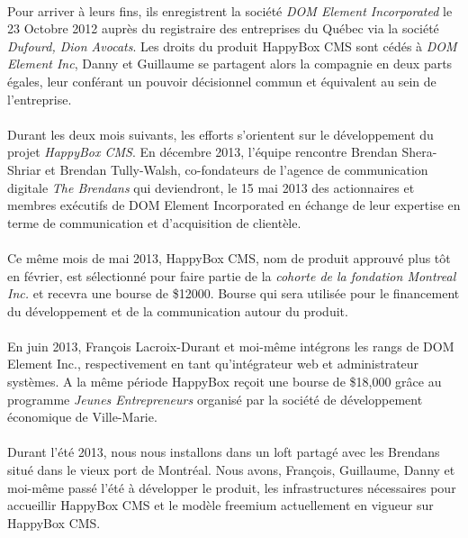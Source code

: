\documentclass[11pt, a4paper ]{article}
\begin{document}
\begin{spacing}{1.5}
\paragraph{}
Pour arriver à leurs fins, ils enregistrent la société \emph{DOM Element Incorporated} le 23 Octobre 2012 auprès du registraire des entreprises du Québec via la société \emph{Dufourd, Dion Avocats}. Les droits du produit HappyBox CMS sont cédés à \emph{DOM Element Inc}, Danny et Guillaume se partagent alors la compagnie en deux parts égales, leur conférant un pouvoir décisionnel commun et équivalent au sein de l'entreprise.

\paragraph{}
Durant les deux mois suivants, les efforts s'orientent sur le développement du projet \emph{HappyBox CMS}.
En décembre 2013, l'équipe rencontre Brendan Shera-Shriar et Brendan Tully-Walsh, co-fondateurs de l'agence de communication digitale \emph{The Brendans} qui deviendront, le 15 mai 2013 des actionnaires et membres exécutifs de DOM Element Incorporated en échange de leur expertise en terme de communication et d'acquisition de clientèle.


\paragraph{}
Ce même mois de mai 2013, HappyBox CMS, nom de produit approuvé plus tôt en février, est sélectionné pour faire partie de la \emph{cohorte de la fondation Montreal Inc.} et recevra une bourse de \$12000. Bourse qui sera utilisée pour le financement du développement et de la communication autour du produit.


\paragraph{}
En juin 2013, François Lacroix-Durant et moi-même intégrons les rangs de DOM Element Inc., respectivement en tant qu'intégrateur web et administrateur systèmes. A la même période HappyBox reçoit une bourse de  \$18,000 grâce au programme \emph{Jeunes Entrepreneurs} organisé par la société de développement économique de Ville-Marie.

\paragraph{} %
Durant l'été 2013, nous nous installons dans un loft partagé avec les Brendans situé dans le vieux port de Montréal. Nous avons, François, Guillaume, Danny et moi-même passé l'été à développer le produit, les infrastructures nécessaires pour accueillir HappyBox CMS et le modèle freemium actuellement en vigueur sur HappyBox CMS.



\end{spacing}
\end{document}
